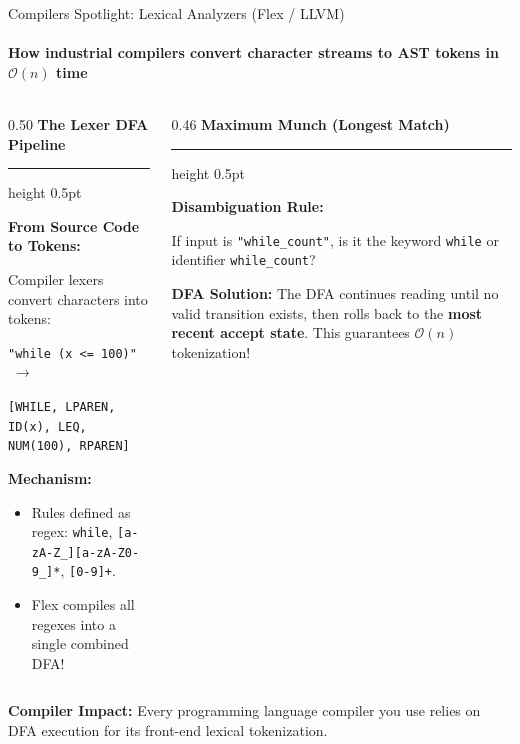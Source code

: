 \documentclass[aspectratio=169, 10pt]{beamer}
\newcommand{\colheader}[1]{%
  {\noindent\footnotesize\bfseries\color{gimpanavy}#1}%
  \vspace{0.02cm}%
  {\color{gimpanavy!30}\hrule height 0.5pt}%
  \vspace{0.05cm}%
}
\newcommand{\cardtitle}[1]{{\noindent\footnotesize\bfseries\color{gimpanavy}#1}\par\vspace{0.03cm}}
\newcommand{\greentitle}[1]{{\noindent\footnotesize\bfseries\color{accentGreen}#1}\par\vspace{0.03cm}}
\begin{document}
\begin{frame}{Compilers Spotlight: Lexical Analyzers (Flex / LLVM)}
  \framesubtitle{How industrial compilers convert character streams to AST tokens in $\mathcal{O}(n)$ time}
  
  \begin{columns}[T]
    \begin{column}{0.50\textwidth}
      \colheader{The Lexer DFA Pipeline}
      \begin{tcolorbox}[conceptcard]
        \cardtitle{From Source Code to Tokens:}
        {\scriptsize
        Compiler lexers convert characters into tokens:
        \vspace{0.03cm}
        
        \texttt{"while (x <= 100)"} $\;\longrightarrow\;$\par
        {\tiny\texttt{[WHILE, LPAREN, ID(x), LEQ, NUM(100), RPAREN]}}
        \vspace{0.04cm}
        
        \textbf{Mechanism:}
        \begin{itemize}\setlength{\itemsep}{1.5pt}\scriptsize
          \item Rules defined as regex: \texttt{while}, \texttt{[a-zA-Z\_][a-zA-Z0-9\_]*}, \texttt{[0-9]+}.
          \item Flex compiles all regexes into a single combined DFA!
        \end{itemize}
        }
      \end{tcolorbox}
    \end{column}
    
    \begin{column}{0.46\textwidth}
      \colheader{Maximum Munch (Longest Match)}
      \begin{tcolorbox}[examplecard]
        \greentitle{Disambiguation Rule:}
        {\scriptsize
        If input is \texttt{"while\_count"}, is it the keyword \texttt{while} or identifier \texttt{while\_count}?
        \vspace{0.04cm}
        
        \textbf{DFA Solution:}
        The DFA continues reading until no valid transition exists, then rolls back to the \textbf{most recent accept state}. This guarantees $\mathcal{O}(n)$ tokenization!
        }
      \end{tcolorbox}
    \end{column}
  \end{columns}
  
  \vspace{0.08cm}
  \begin{tcolorbox}[spotlightcard]
    {\scriptsize\textbf{Compiler Impact:} Every programming language compiler you use relies on DFA execution for its front-end lexical tokenization.}
  \end{tcolorbox}
\end{frame}
\end{document}
